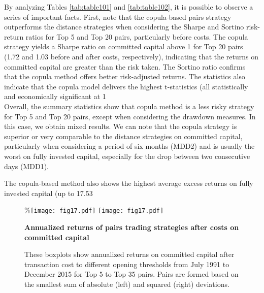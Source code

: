 \documentclass[a4paper]{article}
\begin{document}
By analyzing Tables \ref{tab:table101} and \ref{tab:table102}, it is possible to observe a series of important facts. First, note that the copula-based pairs strategy outperforms the distance strategies when considering the Sharpe and Sortino risk-return ratios for Top 5 and Top 20 pairs, particularly before costs. The copula strategy yields a Sharpe ratio on committed capital above 1 for Top 20 pairs (1.72 and 1.03 before and after costs, respectively), indicating that the returns on committed capital are greater than the risk taken. The Sortino ratio confirms that the copula method offers better risk-adjusted returns. The statistics also indicate that the copula model delivers the highest t-statistics (all statistically and economically significant at 1\\%

Overall, the summary statistics show that copula method is a less risky strategy for Top 5 and Top 20 pairs, except when considering the drawdown measures. In this case, we obtain mixed results. We can note that the copula strategy is superior or very comparable to the distance strategies on committed capital, particularly when considering a period of six months (MDD2) and is usually the worst on fully invested capital, especially for the drop between two consecutive days (MDD1).

The copula-based method also shows the highest average excess returns on fully invested capital (up to 17.53\\%
	
	\begin{figure}[H]
		\centering
		\%\texttt{[image: fig17.pdf]}
		\texttt{[image: fig17.pdf]}
		\caption{\textbf{Annualized returns of pairs trading strategies after costs on committed capital}}
		\caption*{\justifying \tiny These boxplots show annualized returns on committed capital after transaction cost to different opening thresholds from July 1991 to December 2015 for Top 5 to Top 35 pairs. Pairs are formed based on the smallest sum of absolute (left) and squared (right) deviations.}
		\label{fig:fig17}
	\end{figure}
	
\end{document}
